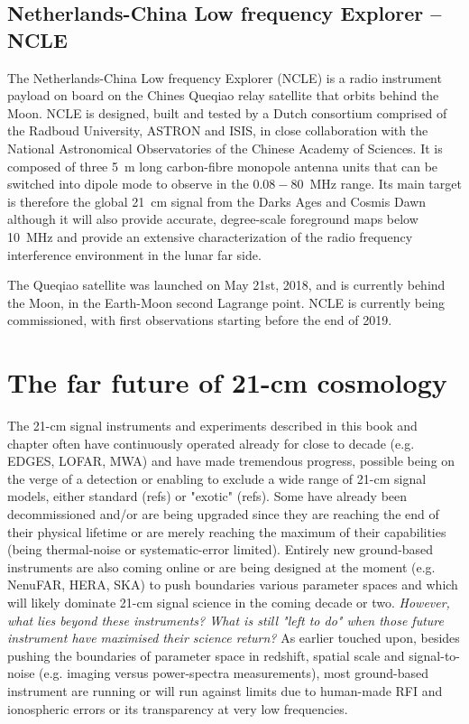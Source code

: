 \subsection{Netherlands-China Low frequency Explorer -- NCLE}

The Netherlands-China Low frequency Explorer (NCLE) is a radio instrument payload on board on the Chines Queqiao relay satellite that orbits behind the Moon. NCLE is designed, built and tested by a Dutch consortium comprised of the Radboud University, ASTRON and ISIS, in close collaboration with the National Astronomical Observatories of the Chinese Academy of Sciences. It is composed of three 5~m long carbon-fibre monopole antenna units that can be switched into dipole mode to observe in the $0.08-80$~MHz range. Its main target is therefore the global 21~cm signal from the Darks Ages and Cosmis Dawn although it will also provide accurate, degree-scale foreground maps below 10~MHz and provide an extensive characterization of the radio frequency interference environment in the lunar far side.

The Queqiao satellite was launched on May 21st, 2018, and is currently behind the Moon, in the Earth-Moon second Lagrange point. NCLE is currently being commissioned, with first observations starting before the end of 2019.


 

\section{The far future of 21-cm cosmology}

The 21-cm signal instruments and experiments described in this book and chapter often have continuously operated already for close to decade (e.g. EDGES, LOFAR, MWA) and have made tremendous progress, possible being on the verge of a detection or enabling to exclude a wide range of 21-cm signal models, either standard (refs) or "exotic" (refs). Some have already been decommissioned and/or are being upgraded since they are reaching the end of their physical lifetime or are merely reaching the maximum of their capabilities (being thermal-noise or systematic-error limited). Entirely new ground-based instruments are also coming online or are being designed at the moment (e.g. NenuFAR, HERA, SKA) to push boundaries various parameter spaces and which will likely dominate 21-cm signal science in the coming decade or two. {\sl However, what lies beyond these instruments? What is still "left to do" when those future instrument have maximised their science return?} As earlier touched upon, besides pushing the boundaries of parameter space in redshift, spatial scale and signal-to-noise (e.g. imaging versus power-spectra measurements), most ground-based instrument are running or will run against limits due to human-made RFI and ionospheric errors or its transparency at very low frequencies. 

